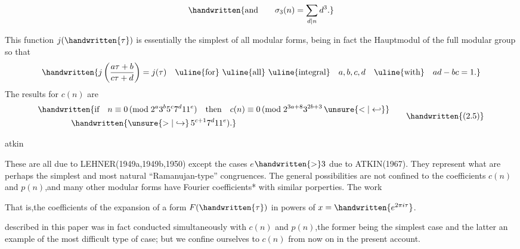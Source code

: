 
\[
\handwritten{\text{and}\qquad \sigma_{3}(n)=\sum_{d\mid n}d^{3}.}
\]

This function $j(\handwritten{\tau})$ is essentially the simplest of all modular forms, being in fact the Hauptmodul of the full modular group so that
\[
\handwritten{j\left(\frac{a\tau+b}{c\tau+d}\right)=j(\tau)\quad
\text{\uline{for} \uline{all} \uline{integral}}\quad a,b,c,d\quad
\text{\uline{with}}\quad ad-bc=1.}
\]
The results for $c(n)$ are
\[
\begin{aligned}
&\handwritten{\text{if}\quad n\equiv0\,(\mathrm{mod}\;2^{a}3^{b}5^{c}7^{d}11^{e})\quad
\text{then}\quad c(n)\equiv0\,(\mathrm{mod}\;2^{3a+8}3^{2b+3}\,\unsure{<|\hookleftarrow}}\\
&\hspace{4em}\handwritten{\unsure{>|\hookrightarrow}\,5^{c+1}7^{d}11^{e}).}
\end{aligned}
\tag*{\handwritten{(2.5)}}
\]


\noindent\hfill atkin 

\noindent These are all due to LEHNER(1949a,1949b,1950) except the cases \uline{$e$}$\handwritten{>}3$ due to ATKIN(1967). They represent what are perhaps the simplest and most natural ``Ramanujan-type'' congruences. The general possibilities are not confined to the coefficients \uline{$c(n)$} and \uline{$p(n)$},and many other modular forms have Fourier coefficients* with similar porperties. The work

\noindent\handwritten{\rule{\linewidth}{0.4pt}}

\noindent *That is,the coefficients of the expansion of a form $F(\handwritten{\tau})$ in powers of $x=\handwritten{e^{2\pi i\tau}}$.

\noindent\handwritten{\rule{\linewidth}{0.4pt}}

\noindent described in this paper was in fact conducted simultaneously with \uline{$c(n)$} and \uline{$p(n)$},the former being the simplest case and the latter an example of the most difficult type of case; but we confine ourselves to \uline{$c(n)$} from now on in the present account.


